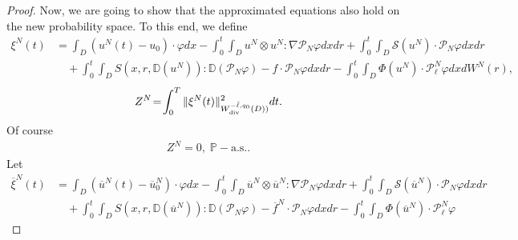 \documentclass[reqno]{amsart}
\theoremstyle{definition}
\theoremstyle{remark}
\numberwithin{equation}{section} \allowdisplaybreaks
\begin{document}
\begin{proof}
Now, we are going to show that the approximated equations also hold
on the new probability space. To this end, we define
\begin{align*}
\xi^N(t)&\!=\!\int_{D}(u^N(t)-u_0)\cdot\varphi dx-
\int_0^t\!\!\!\int_{D}u^N\otimes u^N :\nabla\mathcal{P}_N\varphi dxdr+{\int_0^t\!\!\!
\int_{D}\mathcal{S}(u^N)\cdot\mathcal{P}_N\varphi dxdr}\\
&\quad+\!\int_0^t\!\!\!\int_{D}S(x,r,\mathbb{D}(u^N)):\mathbb{D}(\mathcal{P}_N\varphi)\!
-\!f\!\cdot\! \mathcal{P}_N\varphi dx
dr\!-\!\int_0^t\!\!\!\int_{D}\Phi(u^N)\cdot\mathcal{P}^N_{\ell}\varphi
dx dW^N(r) ,
\end{align*}
\begin{align*}
Z^N\!=\!\int_0^T
\|\xi^N(t)\|^2_{W_{\rm{div}}^{-\tilde{\ell},q_0}(D))}dt.
\end{align*}
Of course
\begin{align*}
Z^N=0,\; \mathbb{P}-\text{a.s.}.
\end{align*}
Let \begin{align*}
\overline{\xi}^N(t)&\!=\!\int_{D}(\overline{u}^N(t)-\overline{u}^N_0)\cdot\varphi
dx- \int_0^t\!\!\!\int_{D}\overline{u}^N\otimes \overline{u}^N
:\nabla\mathcal{P}_N\varphi
dxdr+{\int_0^t\!\!\!\int_{D}
\mathcal{S}(\overline{u}^N)\cdot\mathcal{P}_N\varphi dxdr}\\
&\quad+\!\int_0^t\!\!\!\int_{D}S(x,r,\mathbb{D}(\overline{u}^N)):\mathbb{D}(\mathcal{P}_N\varphi)
\!-\!\overline{f}^N\!\!\cdot\! \mathcal{P}_N\varphi dx
dr\!-\!\int_0^t\!\!\!\int_{D}\Phi(\overline{u}^N)\cdot\mathcal{P}^N_{\ell}\varphi

\end{align*}
\end{proof}
\end{document}
